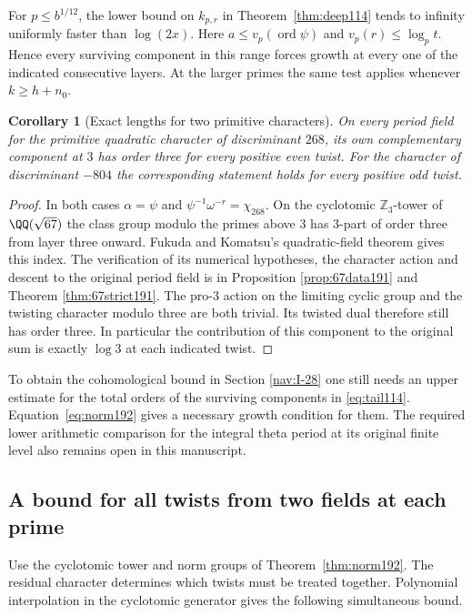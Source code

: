\documentclass[a4paper,11pt]{article}
\newtheorem{corollary}[proposition]{Corollary}
\theoremstyle{definition}
\theoremstyle{remark}
\newcommand{\ZZ}{\mathbb Z}\newcommand{\ord}{\operatorname{ord}}
\numberwithin{equation}{section}
\begin{document}
For \(p\le b^{1/12}\), the lower bound on \(k_{p,r}\) in
Theorem~\ref{thm:deep114} tends to infinity uniformly faster
than \(\log(2x)\). Here \(a\le v_p(\operatorname{ord}\psi)\)
and \(v_p(r)\le\log_p t\). Hence every surviving component in
this range forces growth at every one of the indicated consecutive
layers. At the larger primes the same test applies whenever
\(k\ge h+n_0\).

\begin{corollary}[Exact lengths for two primitive characters]
\label{cor:67strict192}
On every period field for the primitive quadratic character of
discriminant \(268\), its own complementary component at \(3\)
has order three for every positive even twist. For the character
of discriminant \(-804\) the corresponding statement holds for
every positive odd twist.
\end{corollary}
\begin{proof}
In both cases \(\alpha=\psi\) and
\(\psi^{-1}\omega^{-r}=\chi_{268}\). On the cyclotomic
\(\ZZ_3\)-tower of \(\QQ(\sqrt{67})\) the class group modulo
the primes above 3 has \(3\)-part of order three from layer
three onward. Fukuda and Komatsu's quadratic-field theorem
gives this index. The verification of its numerical hypotheses,
the character action and descent to the original period field is in
Proposition \ref{prop:67data191} and Theorem \ref{thm:67strict191}. The pro-\(3\) action on the limiting cyclic group
and the twisting character modulo three are both trivial. Its
twisted dual therefore still has order three. In particular the
contribution of this component to the original sum is exactly
\(\log 3\) at each indicated twist.
\end{proof}

To obtain the cohomological bound in Section \ref{nav:I-28} one still needs
an upper estimate for the total orders of the surviving components
in \eqref{eq:tail114}. Equation~\eqref{eq:norm192} gives a
necessary growth condition for them. The required lower arithmetic
comparison for the integral theta period at its original finite
level also remains open in this manuscript.

\subsection{A bound for all twists from two fields at each prime}\label{nav:III-32}
Use the cyclotomic tower and norm groups of
Theorem~\ref{thm:norm192}. The residual character determines
which twists must be treated together. Polynomial interpolation
in the cyclotomic generator gives the following simultaneous
bound.
\end{document}
